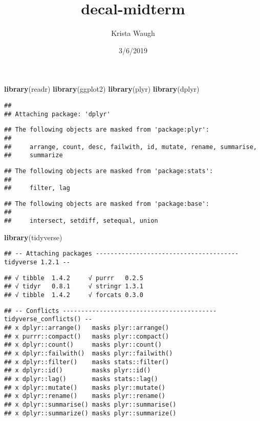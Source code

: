 \documentclass[]{article}
\title{decal-midterm}
\author{Krista Waugh}
\date{3/6/2019}
\newenvironment{Shaded}{\begin{snugshade}}{\end{snugshade}}
\newcommand{\KeywordTok}[1]{\textcolor[rgb]{0.13,0.29,0.53}{\textbf{#1}}}
\newcommand{\NormalTok}[1]{#1}
\begin{document}
\maketitle

\begin{Shaded}
\begin{Highlighting}[]
\KeywordTok{library}\NormalTok{(readr)}
\KeywordTok{library}\NormalTok{(ggplot2)}
\KeywordTok{library}\NormalTok{(plyr)}
\KeywordTok{library}\NormalTok{(dplyr)}
\end{Highlighting}
\end{Shaded}

\begin{verbatim}
## 
## Attaching package: 'dplyr'
\end{verbatim}

\begin{verbatim}
## The following objects are masked from 'package:plyr':
## 
##     arrange, count, desc, failwith, id, mutate, rename, summarise,
##     summarize
\end{verbatim}

\begin{verbatim}
## The following objects are masked from 'package:stats':
## 
##     filter, lag
\end{verbatim}

\begin{verbatim}
## The following objects are masked from 'package:base':
## 
##     intersect, setdiff, setequal, union
\end{verbatim}

\begin{Shaded}
\begin{Highlighting}[]
\KeywordTok{library}\NormalTok{(tidyverse)}
\end{Highlighting}
\end{Shaded}

\begin{verbatim}
## -- Attaching packages --------------------------------------- tidyverse 1.2.1 --
\end{verbatim}

\begin{verbatim}
## √ tibble  1.4.2     √ purrr   0.2.5
## √ tidyr   0.8.1     √ stringr 1.3.1
## √ tibble  1.4.2     √ forcats 0.3.0
\end{verbatim}

\begin{verbatim}
## -- Conflicts ------------------------------------------ tidyverse_conflicts() --
## x dplyr::arrange()   masks plyr::arrange()
## x purrr::compact()   masks plyr::compact()
## x dplyr::count()     masks plyr::count()
## x dplyr::failwith()  masks plyr::failwith()
## x dplyr::filter()    masks stats::filter()
## x dplyr::id()        masks plyr::id()
## x dplyr::lag()       masks stats::lag()
## x dplyr::mutate()    masks plyr::mutate()
## x dplyr::rename()    masks plyr::rename()
## x dplyr::summarise() masks plyr::summarise()
## x dplyr::summarize() masks plyr::summarize()
\end{verbatim}
\end{document}
